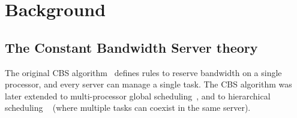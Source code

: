 \chapter{Background\label{chap:background}}


\section{The Constant Bandwidth Server theory\label{sec:CBS}}
%
% 

%
%
The original CBS algorithm~\cite{AbeniB98} defines rules to reserve 
bandwidth on a single processor, and every server can manage a single 
task. The CBS algorithm was later extended to multi-processor global 
scheduling~\cite{baruah2002implementing}, and to hierarchical scheduling
~\cite{lipari2001hierarchical,journals/jec/LipariB05,Lip05-comp} (where
multiple tasks can coexist in the same server).

